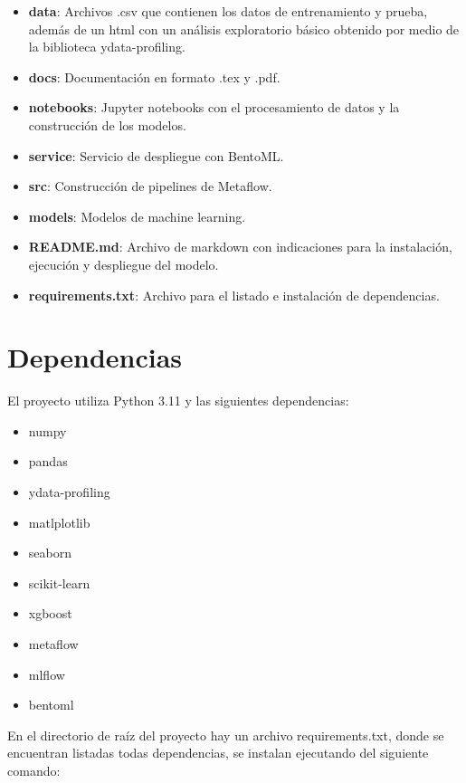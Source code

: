 \documentclass[11pt,a4paper]{report}
\begin{document}
\begin{itemize}
    \item \textbf{data}: Archivos .csv que contienen los datos de entrenamiento y prueba, además de un html con un análisis exploratorio básico obtenido por medio de la biblioteca ydata-profiling.
    \item \textbf{docs}: Documentación en formato .tex y .pdf.
    \item \textbf{notebooks}: Jupyter notebooks con el procesamiento de datos y la construcción de los modelos.
    \item \textbf{service}: Servicio de despliegue con BentoML.
    \item \textbf{src}: Construcción de pipelines de Metaflow.
    \item \textbf{models}: Modelos de machine learning.
    \item \textbf{README.md}: Archivo de markdown con indicaciones para la instalación, ejecución y despliegue del modelo.
    \item \textbf{requirements.txt}: Archivo para el listado e instalación de dependencias.
\end{itemize}


\chapter*{Dependencias}

El proyecto utiliza Python 3.11 y las siguientes dependencias:

\begin{itemize}
    \item numpy
    \item pandas
    \item ydata-profiling
    \item matlplotlib
    \item seaborn
    \item scikit-learn
    \item xgboost
    \item metaflow
    \item mlflow
    \item bentoml
\end{itemize}

En el directorio de raíz del proyecto hay un archivo requirements.txt, donde se encuentran listadas todas dependencias, se instalan ejecutando del siguiente comando:
\end{document}
